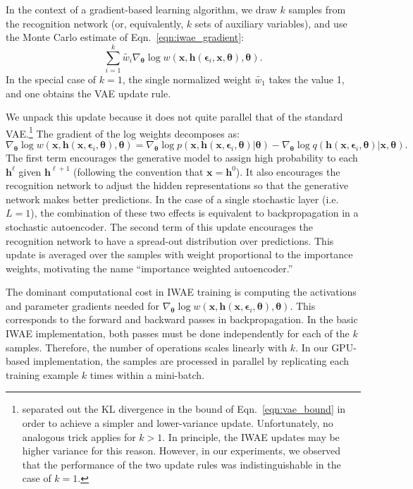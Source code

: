 \documentclass{article} %
\newcommand{\hid}{\mathbf{h}}
\newcommand{\hidLayer}[1]{\hid^{#1}}
\newcommand{\params}{{\boldsymbol{\theta}}}
\newcommand{\obs}{\mathbf{x}}
\newcommand{\numLayers}{L}
\newcommand{\layerIdx}{\ell}
\newcommand{\pmfGen}{p}
\newcommand{\pmfRec}{q}
\newcommand{\numSamples}{k}
\newcommand{\sampleIdx}{i}
\newcommand{\aux}{\boldsymbol{\epsilon}}
\newcommand{\auxS}[1]{\aux_{#1}}
\newcommand{\isWeight}{w}
\newcommand{\isWeightNormS}[1]{\widetilde{w_{#1}}}
\begin{document}
In the context of a gradient-based learning algorithm, we draw $\numSamples$ samples from the recognition network (or, equivalently, $\numSamples$ sets of auxiliary variables), and use the Monte Carlo estimate of Eqn.~\ref{eqn:iwae_gradient}:
\begin{equation}
\label{eqn:grad_ksample_objective}
\sum_{\sampleIdx=1}^\numSamples \isWeightNormS{\sampleIdx} \nabla_{\params}\log \isWeight\left(\obs, \hid(\auxS{\sampleIdx}, \obs, \params), \params\right).
\end{equation}
In the special case of $\numSamples = 1$, the single normalized weight $\isWeightNormS{1}$ takes the value 1, and one obtains the VAE update rule.


We unpack this update because it does not quite parallel that of the standard VAE.\footnote{\citet{vae} separated out the KL divergence in the bound of Eqn.~\ref{eqn:vae_bound} in order to achieve a simpler and lower-variance update. Unfortunately, no analogous trick applies for $\numSamples > 1$. In principle, the IWAE updates may be higher variance for this reason. However, in our experiments, we observed that the performance of the two update rules was indistinguishable in the case of $\numSamples=1$.} The gradient of the log weights decomposes as:
\begin{equation}
\nabla_\params \log \isWeight(\obs, \hid(\obs, \auxS{\sampleIdx}, \params), \params) = \nabla_\params \log \pmfGen(\obs,\hid(\obs, \auxS{\sampleIdx}, \params)|\params) - \nabla_\params \log \pmfRec(\hid(\obs, \auxS{\sampleIdx}, \params)|\obs,\params).
\end{equation}
The first term encourages the generative model to assign high probability to each $\hidLayer{\layerIdx}$ given $\hidLayer{\layerIdx+1}$ (following the convention that $\obs = \hidLayer{0}$). It also encourages the recognition network to adjust the hidden representations so that the generative network makes better predictions. In the case of a single stochastic layer (i.e.~$\numLayers=1$), the combination of these two effects is equivalent to backpropagation in a stochastic autoencoder. The second term of this update encourages the recognition network to have a spread-out distribution over predictions. This update is averaged over the samples with weight proportional to the importance weights, motivating the name ``importance weighted autoencoder.'' 

The dominant computational cost in IWAE training is computing the activations and parameter gradients needed for $\nabla_\params \log \isWeight(\obs, \hid(\obs, \auxS{\sampleIdx}, \params), \params)$. This corresponds to the forward and backward passes in backpropagation. In the basic IWAE implementation, both passes must be done independently for each of the $\numSamples$ samples. Therefore, the number of operations scales linearly with $\numSamples$. In our GPU-based implementation, the samples are processed in parallel by replicating each training example $\numSamples$ times within a mini-batch. 
\end{document}
